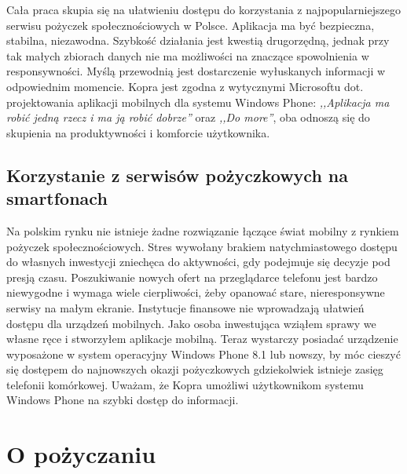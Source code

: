 \documentclass[a4paper,twoside,titlepage,openright]{book}
\begin{document}
Cała praca skupia się na ułatwieniu dostępu do korzystania z najpopularniejszego serwisu pożyczek społecznościowych w Polsce. Aplikacja ma być bezpieczna, stabilna, niezawodna. Szybkość działania jest kwestią drugorzędną, jednak przy tak małych zbiorach danych nie ma możliwości na znaczące spowolnienia w responsywności. Myślą przewodnią jest dostarczenie wyłuskanych informacji w odpowiednim momencie. Kopra jest zgodna z wytycznymi Microsoftu dot. projektowania aplikacji mobilnych dla systemu Windows Phone: \textit{,,Aplikacja ma robić jedną rzecz i ma ją robić dobrze''}\cite{wpDesign} oraz \textit{,,Do more''}\cite{doMore}, oba odnoszą się do skupienia na produktywności i komforcie użytkownika. 

\section*{Korzystanie z serwisów pożyczkowych na smartfonach}

Na polskim rynku nie istnieje żadne rozwiązanie łączące świat mobilny z rynkiem pożyczek społecznościowych. Stres wywołany brakiem natychmiastowego dostępu do własnych inwestycji zniechęca do aktywności, gdy podejmuje się decyzje pod presją czasu. Poszukiwanie nowych ofert na przeglądarce telefonu jest bardzo niewygodne i wymaga wiele cierpliwości, żeby opanować stare, nieresponsywne serwisy na małym ekranie. Instytucje finansowe nie wprowadzają ułatwień dostępu dla urządzeń mobilnych. Jako osoba inwestująca wziąłem sprawy we własne ręce i stworzyłem aplikacje mobilną. Teraz wystarczy posiadać urządzenie wyposażone w system operacyjny Windows Phone 8.1 lub nowszy, by móc cieszyć się dostępem do najnowszych okazji pożyczkowych gdziekolwiek istnieje zasięg telefonii komórkowej. Uważam, że Kopra umożliwi użytkownikom systemu Windows Phone na szybki dostęp do informacji.




\clearpage{\pagestyle{empty}\cleardoublepage}
\chapter{O pożyczaniu}
\end{document}
